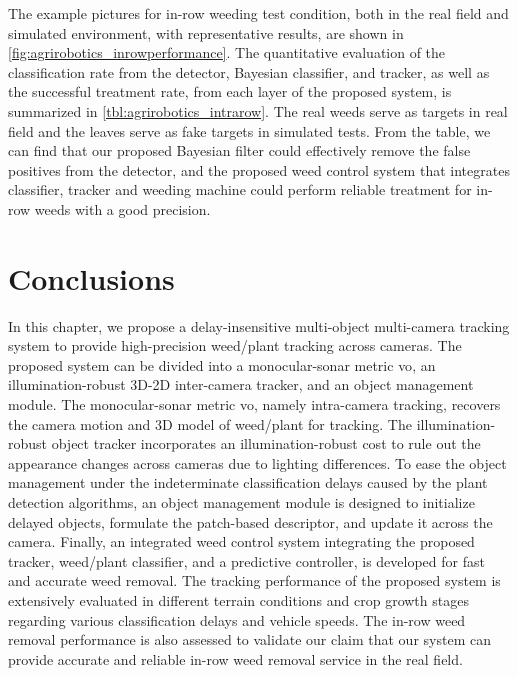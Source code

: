 The example pictures for in-row weeding test condition, both in the real field and simulated environment, with representative results, are shown in \ref{fig:agrirobotics_inrowperformance}. The quantitative evaluation of the classification rate from the detector, Bayesian classifier, and tracker, as well as the successful treatment rate, from each layer of the proposed system, is summarized in \ref{tbl:agrirobotics_intrarow}. The real weeds serve as targets in real field and the leaves serve as fake targets in simulated tests. From the table, we can find that our proposed Bayesian filter could effectively remove the false positives from the detector, and the proposed weed control system that integrates classifier, tracker and weeding machine could perform reliable treatment for in-row weeds with a good precision. 


\section{Conclusions}

In this chapter, we propose a delay-insensitive multi-object multi-camera tracking system to provide high-precision weed/plant tracking across cameras. 
The proposed system can be divided into a monocular-sonar metric \acrshort{vo}, an illumination-robust 3D-2D inter-camera tracker, and an object management module.
The monocular-sonar metric \acrshort{vo}, namely intra-camera tracking, recovers the camera motion and 3D model of weed/plant for tracking.
The illumination-robust object tracker incorporates an illumination-robust cost to rule out the appearance changes across cameras due to lighting differences.
To ease the object management under the indeterminate classification delays caused by the plant detection algorithms, an object management module is designed to initialize delayed objects, formulate the patch-based descriptor, and update it across the camera. 
Finally, an integrated weed control system integrating the proposed tracker, weed/plant classifier, and a predictive controller, is developed for fast and accurate weed removal.
The tracking performance of the proposed system is extensively evaluated in different terrain conditions and crop growth stages regarding various classification delays and vehicle speeds.
The in-row weed removal performance is also assessed to validate our claim that our system can provide accurate and reliable in-row weed removal service in the real field. 